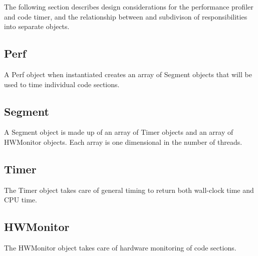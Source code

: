 

The following section describes design considerations for
the performance profiler and code timer, and the relationship 
between and subdivison of responsibilities into separate objects.

\subsection{Perf}

A Perf object when instantiated creates an array of
Segment objects that will be used to time individual
code sections.

\subsection{Segment}

A Segment object is made up of an array of Timer objects
and an array of HWMonitor objects. Each array is one
dimensional in the number of threads.

\subsection{Timer}

The Timer object takes care of general timing to return
both wall-clock time and CPU time.

\subsection{HWMonitor}

The HWMonitor object takes care of hardware monitoring of code
sections.
